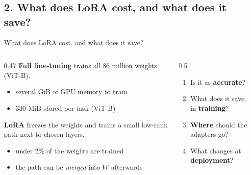 \documentclass[aspectratio=169,11pt]{beamer}
\begin{document}
\subsection{2. What does LoRA cost, and what does it save?}
\begin{frame}{What does LoRA cost, and what does it save?}
\begin{columns}[T]
\begin{column}{0.47\textwidth}
\small
\textbf{Full fine-tuning} trains all 86 million weights (ViT-B).
\begin{itemize}
  \item several GiB of GPU memory to train
  \item 330 MiB stored per task (ViT-B)
\end{itemize}
\medskip
\textbf{LoRA} freezes the weights and trains a small low-rank path next to chosen layers.
\begin{itemize}
  \item under 2\% of the weights are trained
  \item the path can be \emph{merged} into $W$ afterwards
\end{itemize}
\end{column}
\begin{column}{0.5\textwidth}
\centering
\scalebox{0.8}{}
\par\medskip\small
\begin{enumerate}
  \item Is it as \textbf{accurate}?
  \item What does it save in \textbf{training}?
  \item \textbf{Where} should the adapters go?
  \item What changes at \textbf{deployment}?
\end{enumerate}
\end{column}
\end{columns}
\end{frame}

\end{document}
